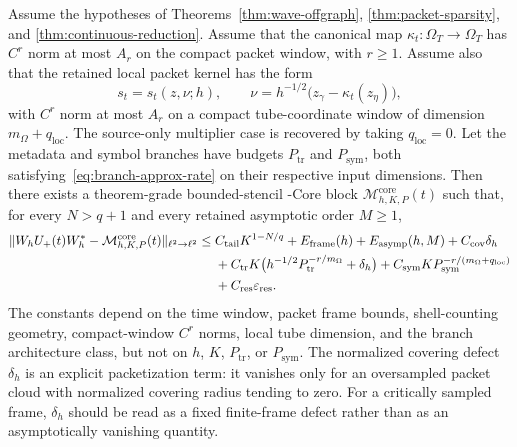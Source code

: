 \begin{theorem}
\label{thm:network-realizable-wave-mino}
Assume the hypotheses of Theorems~\ref{thm:wave-offgraph}, \ref{thm:packet-sparsity}, and \ref{thm:continuous-reduction}.  Assume that the canonical map $\kappa_t:\Omega_T\to\Omega_T$ has $C^r$ norm at most $A_r$ on the compact packet window, with $r\ge 1$.  Assume also that the retained local packet kernel has the form
\[
s_t=s_t(z,\nu;h),
\qquad
\nu=h^{-1/2}\bigl(z_\gamma-\kappa_t(z_\eta)\bigr),
\]
with $C^r$ norm at most $A_r$ on a compact tube-coordinate window of dimension $m_\Omega+q_{\mathrm{loc}}$.  The source-only multiplier case is recovered by taking $q_{\mathrm{loc}}=0$.  Let the metadata and symbol branches have budgets $P_{\mathrm{tr}}$ and $P_{\mathrm{sym}}$, both satisfying~\eqref{eq:branch-approx-rate} on their respective input dimensions.  Then there exists a theorem-grade bounded-stencil \MiNO-Core block $\mathcal M_{h,K,P}^{\mathrm{core}}(t)$ such that, for every $N>q+1$ and every retained asymptotic order $M\ge 1$,
\begin{align}
\label{eq:network-wave-rate}
\|W_hU_+(t)W_h^\ast-\mathcal M_{h,K,P}^{\mathrm{core}}(t)\|_{\ell^2\to\ell^2}
\le{}&
C_{\mathrm{tail}}K^{1-N/q}
+E_{\mathrm{frame}}(h)
+E_{\mathrm{asymp}}(h,M)
+C_{\mathrm{cov}}\delta_h \notag\\
&+C_{\mathrm{tr}}K\bigl(h^{-1/2}P_{\mathrm{tr}}^{-r/m_\Omega}+\delta_h\bigr)
 +C_{\mathrm{sym}}K P_{\mathrm{sym}}^{-r/(m_\Omega+q_{\mathrm{loc}})}\notag\\
&+C_{\mathrm{res}}\varepsilon_{\mathrm{res}} .
\end{align}
The constants depend on the time window, packet frame bounds, shell-counting geometry, compact-window $C^r$ norms, local tube dimension, and the branch architecture class, but not on $h$, $K$, $P_{\mathrm{tr}}$, or $P_{\mathrm{sym}}$.  The normalized covering defect $\delta_h$ is an explicit packetization term: it vanishes only for an oversampled packet cloud with normalized covering radius tending to zero.  For a critically sampled frame, $\delta_h$ should be read as a fixed finite-frame defect rather than as an asymptotically vanishing quantity.
\end{theorem}

